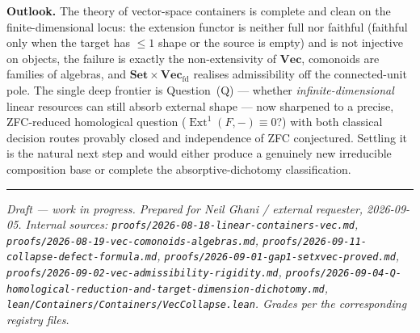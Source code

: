 \documentclass[11pt]{article}
\theoremstyle{plain}
\theoremstyle{definition}
\theoremstyle{remark}
\newcommand{\Set}{\mathbf{Set}}
\newcommand{\Vect}{\mathbf{Vec}}
\newcommand{\Vecfd}{\mathbf{Vec}_{\mathrm{fd}}}
\DeclareMathOperator{\Ext}{Ext}
\begin{document}
\medskip
\noindent\textbf{Outlook.} The theory of vector-space containers is complete and clean on the
finite-dimensional locus: the extension functor is neither full nor faithful (faithful only when the
target has $\leq1$ shape or the source is empty) and is not injective on objects, the failure is
exactly the non-extensivity of $\Vect$, comonoids are families of algebras,
and $\Set\times\Vecfd$ realises admissibility off the connected-unit pole. The single deep frontier
is Question~(Q) --- whether \emph{infinite-dimensional} linear resources can still absorb external
shape --- now sharpened to a precise, ZFC-reduced homological question ($\Ext^1(F,-)\equiv0$?) with
both classical decision routes provably closed and independence of ZFC conjectured. Settling it is
the natural next step and would either produce a genuinely new irreducible composition base or
complete the absorptive-dichotomy classification.

\vfill
\noindent\rule{\textwidth}{0.4pt}\par
\begin{sloppypar}\raggedright
{\small\emph{Draft --- work in progress. Prepared for Neil Ghani / external requester, 2026-09-05.
Internal sources: \texttt{proofs/2026-08-18-linear-containers-vec.md},
\texttt{proofs/2026-08-19-vec-comonoids-algebras.md},
\texttt{proofs/2026-09-11-collapse-defect-formula.md},
\texttt{proofs/2026-09-01-gap1-setxvec-proved.md},
\texttt{proofs/2026-09-02-vec-admissibility-rigidity.md},
\texttt{proofs/2026-09-04-Q-homological-reduction-and-target-dimension-dichotomy.md},
\texttt{lean/\allowbreak Containers/\allowbreak Containers/\allowbreak VecCollapse.lean}.
Grades per the corresponding registry files.}}
\end{sloppypar}
\end{document}
